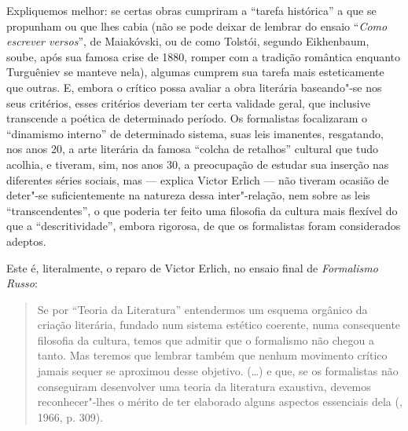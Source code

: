 Expliquemos melhor: se certas obras cumpriram a
``tarefa histórica'' a que se propunham ou que lhes cabia (não se pode deixar de lembrar do ensaio ``\emph{Como escrever versos}'', de
Maiakóvski, ou de como Tolstói, segundo Eikhenbaum, soube, após sua
famosa crise de 1880, romper com a tradição romântica enquanto
Turguêniev se manteve nela), algumas cumprem sua tarefa mais
esteticamente que outras. E, embora o crítico possa avaliar a obra
literária baseando"-se nos seus critérios, esses critérios deveriam ter
certa validade geral, que inclusive transcende a poética de determinado
período. Os formalistas focalizaram o ``dinamismo interno'' de determinado sistema, suas leis imanentes, resgatando, nos anos 20, a
arte literária da famosa ``colcha de retalhos'' cultural que tudo
acolhia, e tiveram, sim, nos anos 30, a preocupação de estudar sua
inserção nas diferentes séries sociais, mas --- explica Victor Erlich ---
não tiveram ocasião de deter"-se suficientemente na natureza dessa
inter"-relação, nem sobre as leis ``transcendentes'', o que poderia
ter feito uma filosofia da cultura mais flexível do que a
``descritividade'', embora rigorosa, de que os formalistas foram considerados
adeptos.

Este é, literalmente, o reparo de Victor Erlich, no ensaio final de
\emph{Formalismo Russo}:

\begin{quotation}
Se por ``Teoria da Literatura'' entendermos um esquema orgânico da
criação literária, fundado num sistema estético coerente, numa
consequente filosofia da cultura, temos que admitir que o formalismo não
chegou a tanto. Mas teremos que lembrar também que nenhum movimento
crítico jamais sequer se aproximou desse objetivo. (\ldots{}) e que, se os
formalistas não conseguiram desenvolver uma teoria da literatura
exaustiva, devemos reconhecer"-lhes o mérito de ter elaborado alguns
aspectos essenciais dela (, 1966, p. 309).
\end{quotation}

